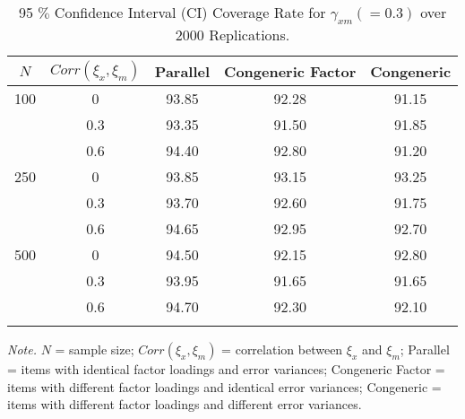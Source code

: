 \documentclass[
  man]{apa6}
\begin{document}
\begin{table}[tbp]

\begin{center}
\begin{threeparttable}

\caption{\label{tab:coverage rate}95 $\%$ Confidence Interval (CI) Coverage Rate for $\gamma_{xm} (= 0.3)$ over 2000 Replications.}

\begin{tabular}{ccccc}
\toprule
$\textit{N}$ & \multicolumn{1}{c}{$Corr(\xi_{x}, \xi_{m})$} & \multicolumn{1}{c}{Parallel} & \multicolumn{1}{c}{Congeneric Factor} & \multicolumn{1}{c}{Congeneric}\\
\midrule
100 & 0 & 93.85 & 92.28 & 91.15\\
 & 0.3 & 93.35 & 91.50 & 91.85\\
 & 0.6 & 94.40 & 92.80 & 91.20\\
250 & 0 & 93.85 & 93.15 & 93.25\\
 & 0.3 & 93.70 & 92.60 & 91.75\\
 & 0.6 & 94.65 & 92.95 & 92.70\\
500 & 0 & 94.50 & 92.15 & 92.80\\
 & 0.3 & 93.95 & 91.65 & 91.65\\
 & 0.6 & 94.70 & 92.30 & 92.10\\
\bottomrule
\addlinespace
\end{tabular}

\begin{tablenotes}[para]
\normalsize{\textit{Note.} $\textit{N}$ = sample size; $Corr(\xi_{x}, \xi_{m})$ = correlation between $\xi_{x}$ and $\xi_{m}$; Parallel = items with identical factor loadings and error variances; Congeneric Factor = items with different factor loadings and identical error variances; Congeneric = items with different factor loadings and different error variances.}
\end{tablenotes}

\end{threeparttable}
\end{center}

\end{table}
\end{document}
